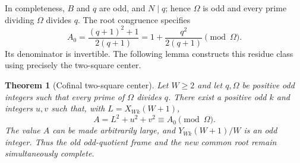 \documentclass[11pt]{article}
\newtheorem{theorem}{Theorem}[section]
\theoremstyle{remark}\newtheorem{remark}[theorem]{Remark}
\begin{document}
In completeness, $B$ and $q$ are odd, and $N\mid q$; hence
$\Omega$ is odd and every prime dividing $\Omega$ divides $q$.
The root congruence specifies
\[
 A_0=\frac{(q+1)^2+1}{2(q+1)}
    =1+\frac{q^2}{2(q+1)}\pmod\Omega.
\]
Its denominator is invertible. The following lemma constructs this
residue class using precisely the two-square center.

\begin{theorem}[Cofinal two-square center]\label{thm:two-square}
Let $W\ge2$ and let $q,\Omega$ be positive odd integers such that
every prime of $\Omega$ divides $q$. There exist a positive odd $k$
and integers $u,v$ such that, with $L=X_{Wk}(W+1)$,
\[
 A=L^2+u^2+v^2\equiv A_0\pmod\Omega.
\]
The value $A$ can be made arbitrarily large, and $Y_{Wk}(W+1)/W$
is an odd integer. Thus the old odd-quotient frame and the new common
root remain simultaneously complete.
\end{theorem}
\end{document}

